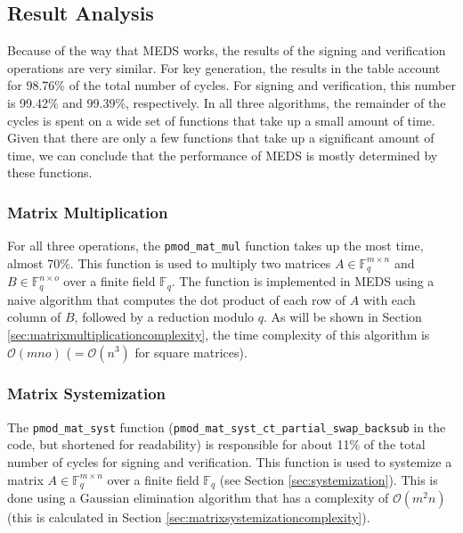 \documentclass[11pt,a4paper]{report}
\theoremstyle{definition}
\begin{document}
\subsection{Result Analysis}
Because of the way that MEDS works, the results of the signing and verification operations are very similar. For key generation, the results in the table account for 98.76\% of the total number of cycles. For signing and verification, this number is 99.42\% and 99.39\%, respectively. In all three algorithms, the remainder of the cycles is spent on a wide set of functions that take up a small amount of time. Given that there are only a few functions that take up a significant amount of time, we can conclude that the performance of MEDS is mostly determined by these functions.

\subsubsection{Matrix Multiplication}
For all three operations, the \texttt{pmod\_mat\_mul} function takes up the most time, almost 70\%. This function is used to multiply two matrices $A \in \mathbb{F}_q^{m \times n}$ and $B \in \mathbb{F}_q^{n \times o}$ over a finite field $\mathbb{F}_q$. The function is implemented in MEDS using a naive algorithm that computes the dot product of each row of $A$ with each column of $B$, followed by a reduction modulo $q$. As will be shown in Section \ref{sec:matrixmultiplicationcomplexity}, the time complexity of this algorithm is $\mathcal{O}(mno)$ ($= \mathcal{O}(n^3)$ for square matrices).

\subsubsection{Matrix Systemization}
The \texttt{pmod\_mat\_syst} function (\texttt{pmod\_mat\_syst\_ct\_partial\_swap\_backsub} in the code, but shortened for readability) is responsible for about 11\% of the total number of cycles for signing and verification. This function is used to systemize a matrix $A \in \mathbb{F}_q^{m \times n}$ over a finite field $\mathbb{F}_q$ (see Section \ref{sec:systemization}). This is done using a Gaussian elimination algorithm that has a complexity of $\mathcal{O}(m^2n)$ (this is calculated in Section \ref{sec:matrixsystemizationcomplexity}).
\end{document}

